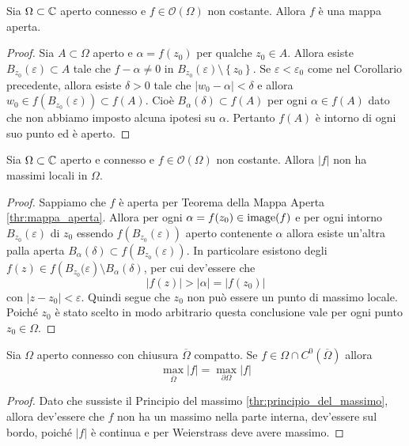 \begin{theorem}
  \label{thr:mappa_aperta}
  Sia $\Omega \subset \mathbb{C}$ aperto connesso e $f \in \mathcal{O}(\Omega)$ non
  costante. Allora $f$ è una mappa aperta.
\end{theorem}
\begin{proof}
  Sia $A \subset \Omega$ aperto e $\alpha = f(z_0)$ per qualche $z_0 \in A$.
  Allora esiste $B_{z_0}(\varepsilon) \subset A$ tale che $f - \alpha \neq 0$ in
  $B_{z_0}(\varepsilon) \setminus \left\{ z_0 \right\}$. Se $\varepsilon
  < \varepsilon_0$ come nel Corollario precedente, allora esiste $\delta > 0$
  tale che $|w_0 - \alpha| < \delta$ e allora $w_0 \in f\left(
  B_{z_0}(\varepsilon) \right) \subset f(A)$. Cioè $B_{\alpha}(\delta) \subset
  f(A)$ per ogni $\alpha \in f(A)$ dato che non abbiamo imposto alcuna ipotesi
  su $\alpha$. Pertanto $f(A)$ è intorno di ogni suo punto ed è aperto. 
\end{proof}

\begin{theorem}
  \label{thr:principio_del_massimo}
  Sia $\Omega \subset \mathbb{C}$ aperto e connesso e $f \in \mathcal{O}(\Omega)$ non
  costante. Allora $|f|$ non ha massimi locali in $\Omega$. 
\end{theorem}
\begin{proof}
  Sappiamo che $f$ è aperta per Teorema della Mappa Aperta
  \ref{thr:mappa_aperta}. Allora per ogni $\alpha = f(z_0) \in \operatorname{image}(f)$ e per
  ogni intorno $B_{z_0}(\varepsilon)$ di $z_0$ essendo
  $f \left(B_{z_0}(\varepsilon) \right)$ aperto contenente $\alpha$ allora esiste
  un'altra palla aperta $B_\alpha(\delta) \subset f\left( B_{z_0}(\varepsilon) 
  \right)$. In particolare esistono degli $f(z) \in f\left( B_{z_0}(\varepsilon
  \right) \setminus B_\alpha(\delta)$, per cui dev'essere che 
  \begin{equation*}
    |f(z)| > |\alpha| = |f(z_0)|
  \end{equation*}
  con $|z-z_0| < \varepsilon$. Quindi segue che $z_0$ non può essere un punto
  di massimo locale. Poiché $z_0$ è stato scelto in modo arbitrario questa
  conclusione vale per ogni punto $z_0 \in \Omega$.
\end{proof}

\begin{corollary}
  \label{cor:massimo_sul_bordo}
  Sia $\Omega$ aperto connesso con chiusura $\overline{\Omega}$ compatto. Se $f
  \in \mathcal{\Omega} \cap C^0(\overline{\Omega})$ allora
  \begin{equation*}
    \max_{\overline{\Omega}} |f| = \max_{\partial \Omega} |f|
  \end{equation*}
\end{corollary}
\begin{proof}
  Dato che sussiste il Principio del massimo \ref{thr:principio_del_massimo},
  allora dev'essere che $f$ non ha un massimo nella parte interna, dev'essere
  sul bordo, poiché $|f|$ è continua e per Weierstrass deve avere massimo. 
\end{proof}

